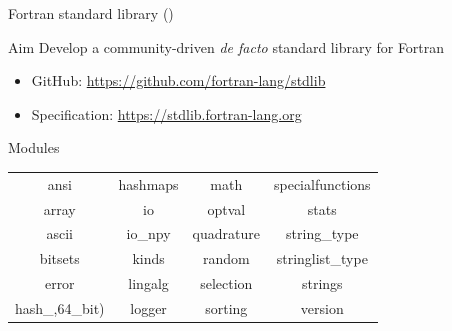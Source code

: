 \documentclass[aspectratio=169]{beamer}
\begin{document}
\begin{frame}{Fortran standard library ()}
\begin{block}{Aim}
Develop a community-driven \textit{de facto} standard library for Fortran
\end{block}
\begin{itemize}
    \item GitHub: \url{https://github.com/fortran-lang/stdlib}
    \item Specification: \url{https://stdlib.fortran-lang.org}
\end{itemize}
\begin{block}{Modules}
    \centering
    \begin{tabular}{cccc}
ansi & hashmaps & math & specialfunctions\\
array & io & optval & stats\\
ascii & io\_npy & quadrature & string\_type\\
bitsets & kinds & random & stringlist\_type\\
error & lingalg & selection & strings\\
hash\_\<32,64\>\_bit) & logger & sorting & version
    \end{tabular}
\end{block}
\end{frame}
\end{document}
